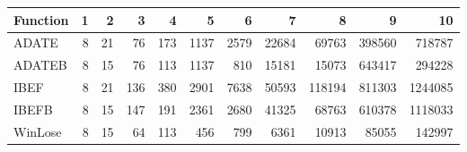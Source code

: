 \begin{table}[ht]
\centering
\begin{tabular}{lrrrrrrrrrr}
  \hline
Function & 1 & 2 & 3 & 4 & 5 & 6 & 7 & 8 & 9 & 10 \\ 
  \hline
ADATE &   8 &  21 &  76 & 173 & 1137 & 2579 & 22684 & 69763 & 398560 & 718787 \\ 
  ADATEB &   8 &  15 &  76 & 113 & 1137 & 810 & 15181 & 15073 & 643417 & 294228 \\ 
  IBEF &   8 &  21 & 136 & 380 & 2901 & 7638 & 50593 & 118194 & 811303 & 1244085 \\ 
  IBEFB &   8 &  15 & 147 & 191 & 2361 & 2680 & 41325 & 68763 & 610378 & 1118033 \\ 
  WinLose &   8 &  15 &  64 & 113 & 456 & 799 & 6361 & 10913 & 85055 & 142997 \\ 
   \hline
\end{tabular}
\end{table}
